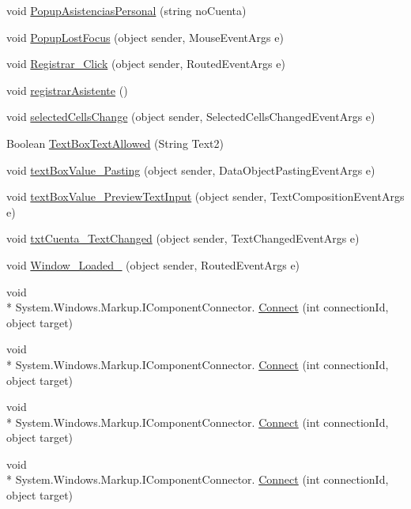 \begin{DoxyCompactItemize}
\item 
void \hyperlink{class_asistencias__wpf_1_1_main_window_a954a70b05258236009e15040f31dda99}{Popup\-Asistencias\-Personal} (string no\-Cuenta)
\item 
void \hyperlink{class_asistencias__wpf_1_1_main_window_aa9cd4d1d96ff7ee36e352a6e2f307d44}{Popup\-Lost\-Focus} (object sender, Mouse\-Event\-Args e)
\item 
void \hyperlink{class_asistencias__wpf_1_1_main_window_ae4a25f0239f778a1a8ace8d4535c42e5}{Registrar\-\_\-\-Click} (object sender, Routed\-Event\-Args e)
\item 
void \hyperlink{class_asistencias__wpf_1_1_main_window_a4b76113e8d64c467e17d08c1bac15914}{registrar\-Asistente} ()
\item 
void \hyperlink{class_asistencias__wpf_1_1_main_window_ae6a7656d280061fc7434874730ee8f34}{selected\-Cells\-Change} (object sender, Selected\-Cells\-Changed\-Event\-Args e)
\item 
Boolean \hyperlink{class_asistencias__wpf_1_1_main_window_a34ecfd31ba03c828ca880d850c91d2ab}{Text\-Box\-Text\-Allowed} (String Text2)
\item 
void \hyperlink{class_asistencias__wpf_1_1_main_window_a80a6d326d7e11f707d02225a6efc21d6}{text\-Box\-Value\-\_\-\-Pasting} (object sender, Data\-Object\-Pasting\-Event\-Args e)
\item 
void \hyperlink{class_asistencias__wpf_1_1_main_window_a952d704cbea0440a9215abf74fe0ab17}{text\-Box\-Value\-\_\-\-Preview\-Text\-Input} (object sender, Text\-Composition\-Event\-Args e)
\item 
void \hyperlink{class_asistencias__wpf_1_1_main_window_af16b10485e73a8cc0c7cef9d26983798}{txt\-Cuenta\-\_\-\-Text\-Changed} (object sender, Text\-Changed\-Event\-Args e)
\item 
void \hyperlink{class_asistencias__wpf_1_1_main_window_aebfda635006d9b11238405a7db87048b}{Window\-\_\-\-Loaded\-\_} (object sender, Routed\-Event\-Args e)
\item 
void \\*
System.\-Windows.\-Markup.\-I\-Component\-Connector. \hyperlink{class_asistencias__wpf_1_1_main_window_a6e541c49de4f0b4a32425f277e2f10c9}{Connect} (int connection\-Id, object target)
\item 
void \\*
System.\-Windows.\-Markup.\-I\-Component\-Connector. \hyperlink{class_asistencias__wpf_1_1_main_window_a6e541c49de4f0b4a32425f277e2f10c9}{Connect} (int connection\-Id, object target)
\item 
void \\*
System.\-Windows.\-Markup.\-I\-Component\-Connector. \hyperlink{class_asistencias__wpf_1_1_main_window_a6e541c49de4f0b4a32425f277e2f10c9}{Connect} (int connection\-Id, object target)
\item 
void \\*
System.\-Windows.\-Markup.\-I\-Component\-Connector. \hyperlink{class_asistencias__wpf_1_1_main_window_a6e541c49de4f0b4a32425f277e2f10c9}{Connect} (int connection\-Id, object target)
\end{DoxyCompactItemize}
